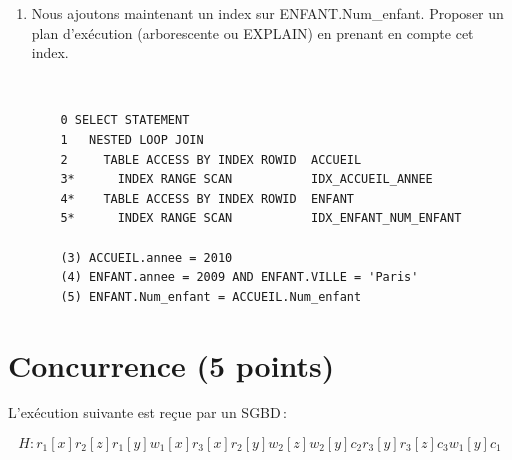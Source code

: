 \begin{enumerate}
	\item Nous ajoutons maintenant un index sur ENFANT.Num\_enfant. Proposer un plan d'ex\'ecution (arborescente ou EXPLAIN) en prenant en compte cet index.
\begin{correction}
    ~
    \begin{verbatim}
    0 SELECT STATEMENT
    1   NESTED LOOP JOIN
    2     TABLE ACCESS BY INDEX ROWID  ACCUEIL
    3*      INDEX RANGE SCAN           IDX_ACCUEIL_ANNEE
    4*    TABLE ACCESS BY INDEX ROWID  ENFANT
    5*      INDEX RANGE SCAN           IDX_ENFANT_NUM_ENFANT

    (3) ACCUEIL.annee = 2010
    (4) ENFANT.annee = 2009 AND ENFANT.VILLE = 'Paris'
    (5) ENFANT.Num_enfant = ACCUEIL.Num_enfant
    \end{verbatim}
\end{correction}
\end{enumerate}	

\section{Concurrence (5 points)}


L'ex\'ecution suivante est re\c{c}ue par un SGBD\,:

$$H : r_1[x] r_2[z] r_1[y] w_1[x] r_3[x] r_2[y] w_2[z] w_2[y] c_2 r_3[y] r_3[z] c_3 w_1[y] c_1 $$

